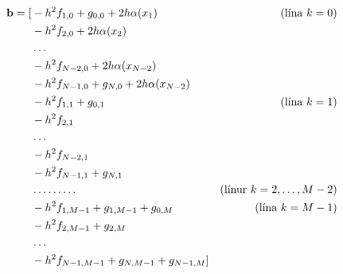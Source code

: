 \documentclass[icelandic,a4paper,12pt]{article}
\begin{document}
{\small \begin{align*}
  \mbox{${\bf b}$} = [ 
  &-h^2 f_{1,0} + g_{0,0} + 2h\alpha(x_1) & (\text{lína } k=0)\\
  &-h^2 f_{2,0} + 2h\alpha(x_2)  \\
  &\ldots \\
  &-h^2 f_{N-2,0} + 2h\alpha(x_{N-2}) \\
  &-h^2 f_{N-1,0} + g_{N,0} + 2h\alpha(x_{N-2}) \\
  &-h^2 f_{1,1} + g_{0,1}   & (\text{lína } k=1)\\
  &-h^2 f_{2,1} \\
  &\ldots \\
  &-h^2 f_{N-2,1}  \\
  &-h^2 f_{N-1,1} +  g_{N,1} \\
   & \ldots \ldots \ldots  & (\text{línur } k=2,\ldots,M-2)\\
  &-h^2 f_{1,M-1} + g_{1,M-1} + g_{0,M} & (\text{lína } k=M-1)\\
  &-h^2 f_{2,M-1} + g_{2,M} \\
  &\ldots \\
  &-h^2 f_{N-1,M-1} + g_{N,M-1} + g_{N-1,M} ]\\
  \end{align*}}




\end{document}
